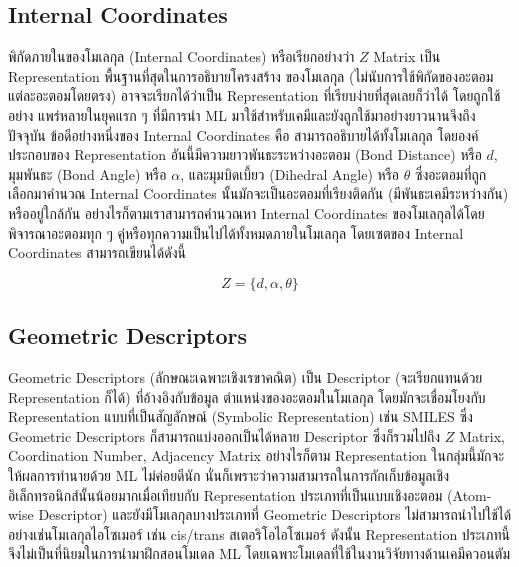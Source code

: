 \subsection{Internal Coordinates}
\label{ssec:internal_coord}

พิกัดภายในของโมเลกุล (Internal Coordinates) หรือเรียกอย่างว่า $Z$ Matrix เป็น Representation พื้นฐานที่สุดในการอธิบายโครงสร้าง%
ของโมเลกุล (ไม่นับการใช้พิกัดของอะตอมแต่ละอะตอมโดยตรง) อาจจะเรียกได้ว่าเป็น Representation ที่เรียบง่ายที่สุดเลยก็ว่าได้ โดยถูกใช้อย่าง%
แพร่หลายในยุคแรก ๆ ที่มีการนำ ML มาใช้สำหรับเคมีและยังถูกใช้มาอย่างยาวนานจึงถึงปัจจุบัน ข้อดีอย่างหนึ่งของ Internal Coordinates คือ%
สามารถอธิบายได้ทั้งโมเลกุล โดยองค์ประกอบของ Representation อันนี้มีความยาวพันธะระหว่างอะตอม (Bond Distance) หรือ $d$, มุมพันธะ
(Bond Angle) หรือ $\alpha$, และมุมบิดเบี้ยว (Dihedral Angle) หรือ $\theta$ ซึ่งอะตอมที่ถูกเลือกมาคำนวณ Internal
Coordinates นั้นมักจะเป็นอะตอมที่เรียงติดกัน (มีพันธะเคมีระหว่างกัน) หรืออยู่ใกล้กัน อย่างไรก็ตามเราสามารถคำนวณหา Internal
Coordinates ของโมเลกุลได้โดยพิจารณาอะตอมทุก ๆ คู่หรือทุกความเป็นไปได้ทั้งหมดภายในโมเลกุล โดยเซตของ Internal Coordinates
สามารถเขียนได้ดังนี้

\begin{equation}\label{eq:internal_coord}
    Z = \{ d, \alpha, \theta \}
\end{equation}

\subsection{Geometric Descriptors}
\label{ssec:geom_descriptor}

Geometric Descriptors (ลักษณะเฉพาะเชิงเรขาคณิต) เป็น Descriptor (จะเรียกแทนด้วย Representation ก็ได้) ที่อ้างอิงกับข้อมูล%
ตำแหน่งของอะตอมในโมเลกุล โดยมักจะเชื่อมโยงกับ Representation แบบที่เป็นสัญลักษณ์ (Symbolic Representation) เช่น SMILES ซึ่ง
Geometric Descriptors ก็สามารถแบ่งออกเป็นได้หลาย Descriptor ซึ่งก็รวมไปถึง $Z$ Matrix, Coordination Number, Adjacency
Matrix อย่างไรก็ตาม Representation ในกลุ่มนี้มักจะให้ผลการทำนายด้วย ML ไม่ค่อยดีนัก นั่นก็เพราะว่าความสามารถในการกักเก็บข้อมูลเชิง%
อิเล็กทรอนิกส์นั้นน้อยมากเมื่อเทียบกับ Representation ประเภทที่เป็นแบบเชิงอะตอม (Atom-wise Descriptor) และยังมีโมเลกุลบางประเภทที่
Geometric Descriptors ไม่สามารถนำไปใช้ได้ อย่างเช่นโมเลกุลไอโซเมอร์ เช่น cis/trans สเตอริโอไอโซเมอร์ ดังนั้น Representation
ประเภทนี้จึงไม่เป็นที่นิยมในการนำมาฝึกสอนโมเดล ML โดยเฉพาะโมเดลที่ใช้ในงานวิจัยทางด้านเคมีควอนตัม\autocite{keith2021,musil2021}

